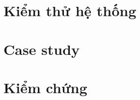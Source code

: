 \section{Kiểm thử hệ thống}

\section{Case study}

\section{Kiểm chứng}


%     
%     
%     
%     
%     
%     
%     
%     
%     
%     

%     
%     

%     
%     
%     
%     
%     
%     

